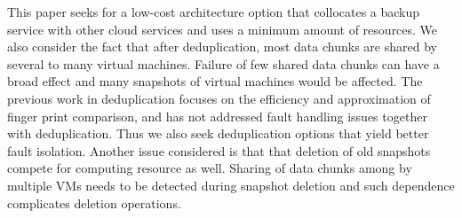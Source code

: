 This paper seeks for a low-cost architecture option  that collocates
a backup service with other cloud services and  uses a minimum amount of resources. 
We also consider the fact that after
deduplication, most data chunks are shared by several to many virtual machines.
Failure of few shared data chunks can have a 
broad effect and many
snapshots of virtual machines would be affected.
The previous work in deduplication focuses on the efficiency and approximation of
finger print comparison, and has not addressed fault handling issues  together with deduplication.
Thus we also seek deduplication options that yield better fault isolation.
Another issue considered is that
that deletion of old snapshots compete for computing resource as well. 
Sharing of data chunks among by multiple VMs needs to be detected during
snapshot   deletion and such dependence complicates deletion operations. 


